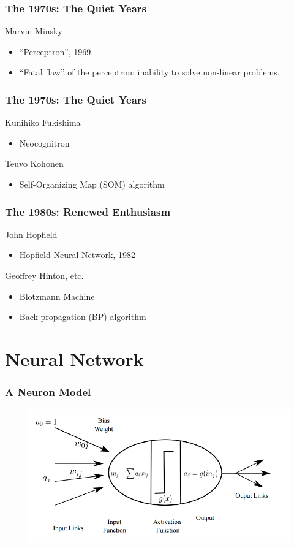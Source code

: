 \documentclass{beamer}
\begin{document}
\begin{frame}
	\frametitle{The 1970s: The Quiet Years}
	Marvin Minsky
	\begin{itemize}
		\item  “Perceptron”, 1969.
		\item “Fatal flaw” of the perceptron; inability to solve
		non-linear problems.
	\end{itemize}
\end{frame}

\begin{frame}
	\frametitle{The 1970s: The Quiet Years}
	Kunihiko Fukishima
	\begin{itemize}
		\item  Neocognitron
	\end{itemize}
	Teuvo Kohonen
	\begin{itemize}
		\item  Self-Organizing Map (SOM) algorithm
	\end{itemize}
\end{frame}

\begin{frame}
	\frametitle{The 1980s: Renewed Enthusiasm}
	John Hopfield
	\begin{itemize}
		\item  Hopfield Neural Network, 1982
	\end{itemize}
	Geoffrey Hinton, etc.
	\begin{itemize}
		\item  Blotzmann Machine
		\item Back-propagation (BP) algorithm
	\end{itemize}
\end{frame}

\section{Neural Network}
\begin{frame}
	\frametitle{A Neuron Model}
	\begin{figure}
		\includegraphics[width=0.95\linewidth]{neuron_model}
	\end{figure}
\end{frame}
\end{document}

